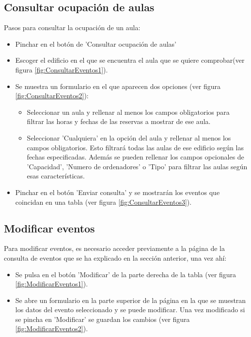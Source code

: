 \subsection{Consultar ocupación de aulas}
Pasos para consultar la ocupación de un aula:
\begin{itemize}
    \item Pinchar en el botón de 'Consultar ocupación de aulas'
    \item Escoger el edificio en el que se encuentra el aula que se quiere comprobar(ver figura \ref{fig:ConsultarEventos1}).
    \item Se muestra un formulario en el que aparecen dos opciones (ver figura \ref{fig:ConsultarEventos2}):
    \begin{itemize}
        \item Seleccionar un aula y rellenar al menos los campos obligatorios para filtrar las horas y fechas de las reservas a mostrar de ese aula.
        \item Seleccionar 'Cualquiera' en la opción del aula y rellenar al menos los campos obligatorios. Esto filtrará todas las aulas de ese edificio según las fechas especificadas. Además se pueden rellenar los campos opcionales de 'Capacidad', 'Numero de ordenadores' o 'Tipo' para filtrar las aulas según esas características.
    \end{itemize}
    \item Pinchar en el botón 'Enviar consulta' y se mostrarán los eventos que coincidan en una tabla (ver figura \ref{fig:ConsultarEventos3}).
\end{itemize}

\subsection{Modificar eventos}
Para modificar eventos, es necesario acceder previamente a la página de la consulta de eventos que se ha explicado en la sección anterior, una vez ahí:
\begin{itemize}
    \item Se pulsa en el botón 'Modificar' de la parte derecha de la tabla (ver figura \ref{fig:ModificarEventos1}).
    \item Se abre un formulario en la parte superior de la página en la que se muestran los datos del evento seleccionado y se puede modificar. Una vez modificado si se pincha en 'Modificar' se guardan los cambios (ver figura \ref{fig:ModificarEventos2}).
\end{itemize}


